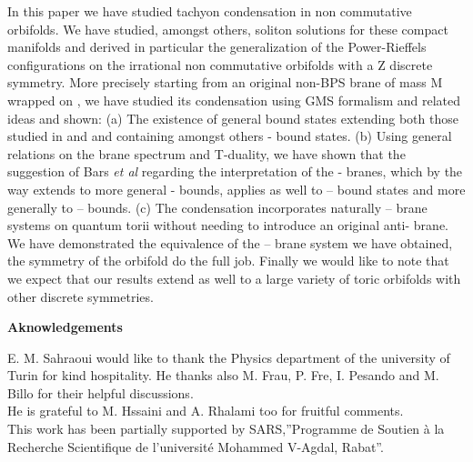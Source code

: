 \documentclass[a4paper,12pt]{article}
\begin{document}
In this paper we have studied tachyon condensation in non
commutative orbifolds. We have studied, amongst others, soliton
solutions for these compact manifolds and derived in particular
the generalization of the Power-Rieffels configurations on the
irrational non commutative orbifolds with a Z\coordHE{} discrete
symmetry. More precisely starting from an original non-BPS \coordHE{}
brane of mass M\coordHE{} wrapped on
\coordHE{}, we have studied its condensation
using GMS formalism and related ideas and shown: (a) The existence
of general bound states extending both those
studied in \cite{g} and \cite{j} and containing amongst others \coordHE{}-\coordHE{} bound states. (b) Using general relations on the brane
spectrum and T-duality, we have shown that the suggestion of Bars
{\it et al} regarding the interpretation of the \coordHE{}-\coordHE{} branes,
which by the way extends to more general \coordHE{}-\coordHE{} bounds, applies
as well to \coordHE{}--\coordHE{} bound states and more
generally to \coordHE{}--\coordHE{} bounds. (c) The
condensation incorporates naturally \coordHE{}--\coordHE{} brane
systems on quantum torii without needing to introduce an original
anti-\coordHE{} brane. We have demonstrated the equivalence of the
\coordHE{}--\coordHE{} brane system we have obtained, the
\coordHE{} symmetry of the orbifold do the full job. Finally
we would like to note that we expect that our results extend as
well to a large variety of toric orbifolds with other discrete
symmetries.\\

\vskip 1cm
\centerline{\large\bf{Aknowledgements}}

E. M. Sahraoui would like to thank the Physics department of the
university of Turin  for kind hospitality. He thanks also M. Frau,
P. Fre, I. Pesando and M. Billo for their helpful discussions.\\
He is grateful to M. Hssaini and A. Rhalami too for fruitful
comments.\\
 This work has been partially supported by SARS,''Programme
de Soutien \`{a} la Recherche Scientifique de l'universit\'{e}
Mohammed V-Agdal, Rabat''.\\
\newpage
\end{document}
